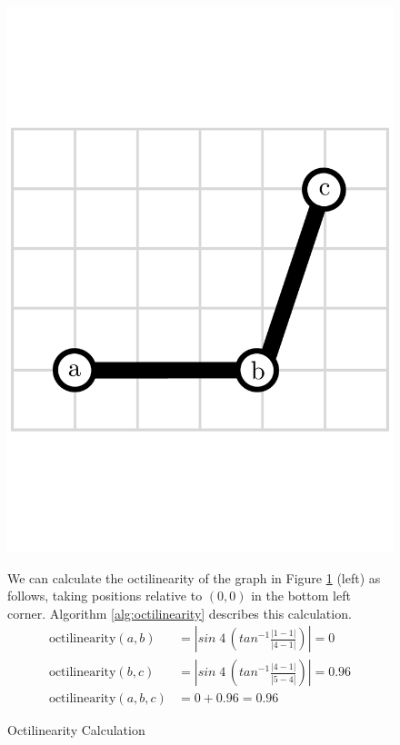 \begin{figure}[h]
\centering
\hspace{-0.5cm}\begin{minipage}{.4\textwidth}
  \includegraphics[width=\linewidth]{img/implementation/octilinearity.pdf}\caption{Octilinearity Calculation\label{fig:octilinearity}}
  \end{minipage}\hspace{0.5cm}\begin{minipage}{.6\textwidth}
We can calculate the octilinearity of the graph in Figure \ref{fig:octilinearity} (left) as follows, taking positions relative to $(0, 0)$ in the bottom left corner. Algorithm \ref{alg:octilinearity} describes this calculation.
$$\begin{aligned}
\text{octilinearity}(a, b) &= |sin\;4\,(tan^{-1}\frac{|1 - 1|}{|4 - 1|})| = 0 \\
\text{octilinearity}(b, c) &= |sin\;4\,(tan^{-1}\frac{|4 - 1|}{|5 - 4|})| = 0.96 \\[0.1cm]
\text{octilinearity}(a, b, c) &= 0 + 0.96 = 0.96
\end{aligned}$$
\end{minipage}
\end{figure}

